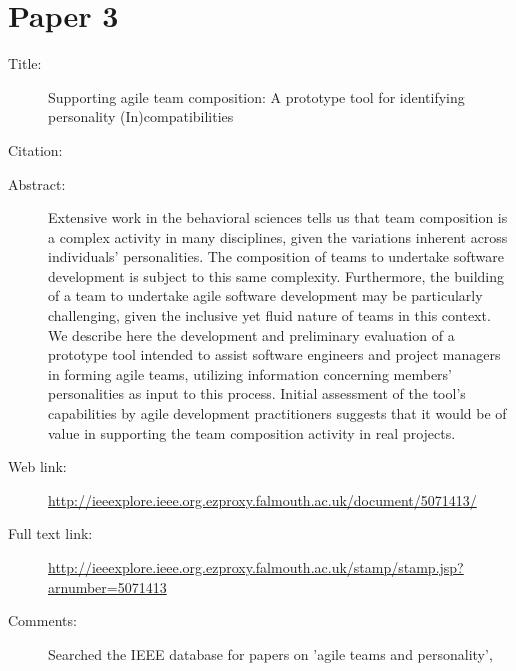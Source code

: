 \documentclass{scrartcl}
\begin{document}
\section*{Paper 3}
\begin{description}
\item[Title:] Supporting agile team composition: A prototype tool for identifying personality (In)compatibilities
\item[Citation:] \cite{Paper3}
\item[Abstract:] {Extensive work in the behavioral sciences tells us that team composition is a complex activity in many disciplines, given the variations inherent across individuals' personalities. The composition of teams to undertake software development is subject to this same complexity. Furthermore, the building of a team to undertake agile software development may be particularly challenging, given the inclusive yet fluid nature of teams in this context. We describe here the development and preliminary evaluation of a prototype tool intended to assist software engineers and project managers in forming agile teams, utilizing information concerning members' personalities as input to this process. Initial assessment of the tool's capabilities by agile development practitioners suggests that it would be of value in supporting the team composition activity in real projects.}
\item[Web link:] \url{http://ieeexplore.ieee.org.ezproxy.falmouth.ac.uk/document/5071413/}
\item[Full text link:] \url{http://ieeexplore.ieee.org.ezproxy.falmouth.ac.uk/stamp/stamp.jsp?arnumber=5071413}
\item[Comments:] Searched the IEEE database for papers on 'agile teams and personality',
\end{description}
\end{document}
